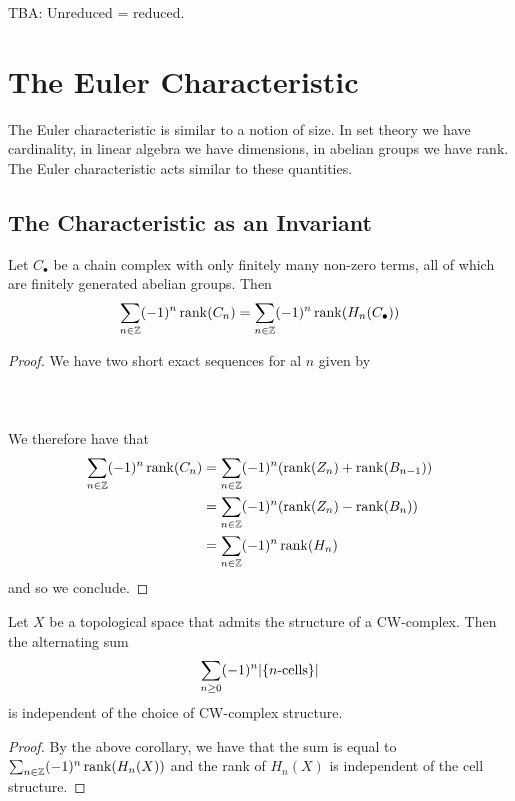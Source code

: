\documentclass[a4paper]{article}
\begin{document}
TBA: Unreduced = reduced. 


\pagebreak
\section{The Euler Characteristic}
The Euler characteristic is similar to a notion of size. In set theory we have cardinality, in linear algebra we have dimensions, in abelian groups we have rank. The Euler characteristic acts similar to these quantities. 

\subsection{The Characteristic as an Invariant}
\begin{crl}{}{} Let $C_\bullet$ be a chain complex with only finitely many non-zero terms, all of which are finitely generated abelian groups. Then $$\sum_{n\in\mathbb{Z}}(-1)^n\rank(C_n)=\sum_{n\in\mathbb{Z}}(-1)^n\rank(H_n(C_\bullet))$$ \tcbline
\begin{proof}
We have two short exact sequences for al $n$ given by \\~\\
\\~\\
We therefore have that 
\begin{align*}
\sum_{n\in\mathbb{Z}}(-1)^n\rank(C_n)&=\sum_{n\in\mathbb{Z}}(-1)^n(\rank(Z_n)+\rank(B_{n-1}))\\
&=\sum_{n\in\mathbb{Z}}(-1)^n(\rank(Z_n)-\rank(B_n))\\
&=\sum_{n\in\mathbb{Z}}(-1)^n\rank(H_n)
\end{align*}
and so we conclude. 
\end{proof}
\end{crl}

\begin{prp}{}{} Let $X$ be a topological space that admits the structure of a CW-complex. Then the alternating sum $$\sum_{n\geq 0}(-1)^n\abs{\{n\text{-cells}\}}$$ is independent of the choice of CW-complex structure. \tcbline
\begin{proof}
By the above corollary, we have that the sum is equal to $\sum_{n\in\mathbb{Z}}(-1)^n\rank(H_n(X))$ and the rank of $H_n(X)$ is independent of the cell structure. 
\end{proof}
\end{prp}
\end{document}
